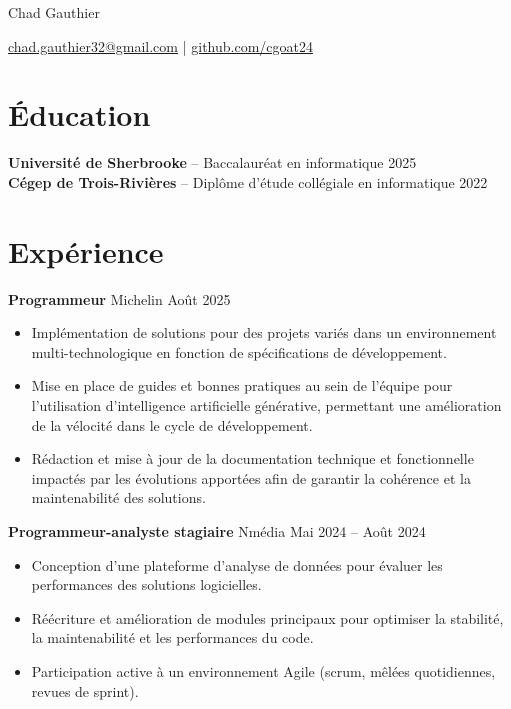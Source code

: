 \documentclass[10pt]{article}       %
\begin{document}
\centerline{\Huge Chad Gauthier}


\centerline{\href{mailto:chad.gauthier32@gmail.com}{chad.gauthier32@gmail.com} | \href{https://www.github.com/cgoat24}{github.com/cgoat24}}

\vspace{-18.5pt}

\section*{Éducation}
\textbf{Université de Sherbrooke} -- Baccalauréat en informatique \hfill 2025 \\
\textbf{Cégep de Trois-Rivières} -- Diplôme d'étude collégiale en informatique \hfill 2022

\vspace{-6.5pt}

\section*{Expérience}
\textbf{Programmeur} {Michelin} \hfill Août 2025 \\
\vspace{-9pt}
\begin{itemize}
  \item Implémentation de solutions pour des projets variés dans un environnement multi-technologique en fonction de spécifications de développement.
  \item Mise en place de guides et bonnes pratiques au sein de l'équipe pour l'utilisation d'intelligence artificielle générative, permettant une amélioration de la vélocité dans le cycle de développement.
  \item Rédaction et mise à jour de la documentation technique et fonctionnelle impactés par les évolutions apportées afin de garantir la cohérence et la maintenabilité des solutions.
\end{itemize}

\textbf{Programmeur-analyste stagiaire} {Nmédia} \hfill Mai 2024 -- Août 2024 \\
\vspace{-9pt}
\begin{itemize}
  \item Conception d'une plateforme d'analyse de données pour évaluer les performances des solutions logicielles.
  \item Réécriture et amélioration de modules principaux pour optimiser la stabilité, la maintenabilité et les performances du code.
  \item Participation active à un environnement Agile (scrum, mêlées quotidiennes, revues de sprint).
\end{itemize}
\end{document}

